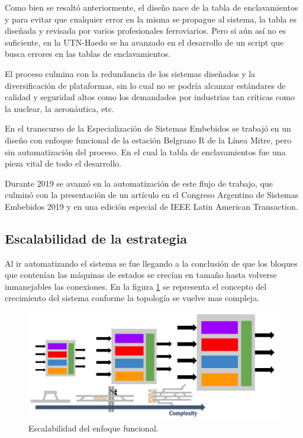 		Como bien se resaltó anteriormente, el diseño nace de la tabla de enclavamientos y para evitar que cualquier error en la misma se propague al sistema, la tabla es diseñada y revisada por varios profesionales ferroviarios. Pero si aún así no es suficiente, en la UTN-Haedo se ha avanzado en el desarrollo de un script que busca errores en las tablas de enclavamientos.
		
		El proceso culmina con la redundancia de los sistemas diseñados y la diversificación de plataformas, sin lo cual no se podría alcanzar estándares de calidad y seguridad altos como los demandados por industrias tan críticas como la nuclear, la aeronáutica, etc. 
		
		En el transcurso de la Especialización de Sistemas Embebidos se trabajó en un diseño con enfoque funcional de la estación Belgrano R de la Línea Mitre, pero sin automatización del proceso. En el cual la tabla de enclavamientos fue una pieza vital de todo el desarrollo.
		
		Durante 2019 se avanzó en la automatización de este flujo de trabajo, que culminó con la presentación de un artículo en el Congreso Argentino de Sistemas Embebidos 2019 y en una edición especial de IEEE Latin American Transaction.
		
	\subsection{Escalabilidad de la estrategia}	
		
		Al ir automatizando el sistema se fue llegando a la conclusión de que los bloques que contenían las máquinas de estados se crecían en tamaño hasta volverse inmanejables las conexiones. En la figura \ref{fig:Escala_Funcional} se representa el concepto del crecimiento del sistema conforme la topología se vuelve mas compleja.		
					
		\begin{figure}[h]
		\centering
			\includegraphics[scale=.4]{./Figures/Funcional_complejidad}
			\caption{Escalabilidad del enfoque funcional.}
			\label{fig:Escala_Funcional}
		\end{figure}
		
